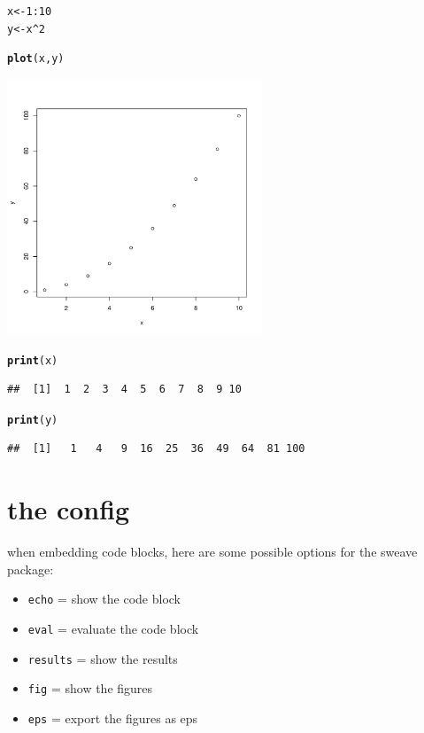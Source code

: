 \documentclass[a4paper]{article}\usepackage[]{graphicx}\usepackage[]{xcolor}
\makeatletter
\newcommand{\hlnum}[1]{\textcolor[rgb]{0.686,0.059,0.569}{#1}}%
\newcommand{\hlopt}[1]{\textcolor[rgb]{0,0,0}{#1}}%
\newcommand{\hlstd}[1]{\textcolor[rgb]{0.345,0.345,0.345}{#1}}%
\newcommand{\hlkwb}[1]{\textcolor[rgb]{0.69,0.353,0.396}{#1}}%
\newcommand{\hlkwd}[1]{\textcolor[rgb]{0.737,0.353,0.396}{\textbf{#1}}}%
\newenvironment{kframe}{%
 \def\at@end@of@kframe{}%
 \ifinner\ifhmode%
  \def\at@end@of@kframe{\end{minipage}}%
  \begin{minipage}{\columnwidth}%
 \fi\fi%
 \def\FrameCommand##1{\hskip\@totalleftmargin \hskip-\fboxsep
 \colorbox{shadecolor}{##1}\hskip-\fboxsep
     \hskip-\linewidth \hskip-\@totalleftmargin \hskip\columnwidth}%
 \MakeFramed {\advance\hsize-\width
   \@totalleftmargin\z@ \linewidth\hsize
   \@setminipage}}%
 {\par\unskip\endMakeFramed%
 \at@end@of@kframe}
\newenvironment{knitrout}{}{} %
\makeatother
\begin{document}
\begin{knitrout}
\color{fgcolor}\begin{kframe}
\begin{alltt}
\hlstd{x} \hlkwb{<-} \hlnum{1}\hlopt{:}\hlnum{10}
\hlstd{y} \hlkwb{<-} \hlstd{x}\hlopt{^}\hlnum{2}

\hlkwd{plot}\hlstd{(x, y)}
\end{alltt}
\end{kframe}

{\centering \includegraphics[width=3in]{figure/demo-1} 

}


\begin{kframe}\begin{alltt}
\hlkwd{print}\hlstd{(x)}
\end{alltt}
\begin{verbatim}
##  [1]  1  2  3  4  5  6  7  8  9 10
\end{verbatim}
\begin{alltt}
\hlkwd{print}\hlstd{(y)}
\end{alltt}
\begin{verbatim}
##  [1]   1   4   9  16  25  36  49  64  81 100
\end{verbatim}
\end{kframe}
\end{knitrout}

\section{the config}

when embedding code blocks, here are some possible options for the sweave package:

\begin{itemize}
  \item \texttt{echo} = show the code block
  \item \texttt{eval} = evaluate the code block
  \item \texttt{results} = show the results
  \item \texttt{fig} = show the figures
  \item \texttt{eps} = export the figures as eps
\end{itemize}
\end{document}
